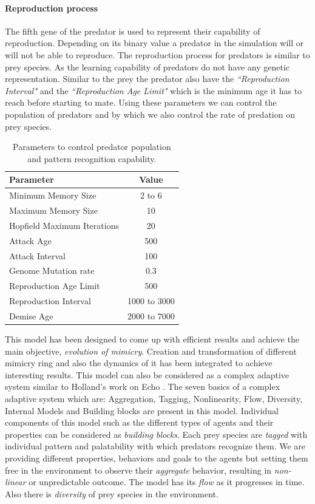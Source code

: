 \documentclass[letterpaper]{article}
\numberwithin{equation}{section}
\begin{document}
\paragraph{Reproduction process}
The  fifth gene of the predator is used to represent their capability of reproduction.  Depending on its binary value a predator in the simulation will or will not be able to reproduce. The reproduction process for predators is similar to prey species. As the learning capability of predators do not have any genetic representation. Similar to the prey the predator also have the \textsl{``Reproduction Interval"} and the \textsl{``Reproduction Age Limit"} which is the minimum age it has to reach before starting to mate. Using these parameters we can control the population of predators and by which we also control the rate of predation on prey species.

\begin{table}[h]
\small
\centering
\begin{tabular}{| l | c |}
	\hline
		\textbf{Parameter} & \textbf{Value} \\ \hline
		Minimum Memory Size & 2 to 6 \\ \hline
		Maximum Memory Size & 10 \\ \hline 
		Hopfield Maximum Iterations & 20 \\ \hline
		Attack Age & 500 \\ \hline
		Attack Interval & 100 \\ \hline
		Genome Mutation rate & 0.3 \\ \hline
		Reproduction Age Limit & 500 \\ \hline
		Reproduction Interval & 1000 to 3000 \\ \hline
		Demise Age & 2000 to 7000 \\
	\hline
\end{tabular}
\caption{Parameters to control predator population and pattern recognition capability.}
\label{tab:predator-control-parameters}
\end{table}

This model has been designed to come up with efficient results and achieve the main objective, \textit{evolution of mimicry}. Creation and transformation of different mimicry ring and also the dynamics of it has been integrated to achieve interesting results. This model can also be considered as a complex adaptive system similar to Holland's work on Echo \citep{holland1996}. The seven basics of a complex adaptive system which are: Aggregation, Tagging, Nonlinearity, Flow, Diversity, Internal Models and Building blocks \citep{holland1996} are present in this model. Individual components of this model such as the different types of agents and their properties can be considered as \textit{building blocks}. Each prey species are \textit{tagged} with individual pattern and palatability with which predators recognize them. We are providing different properties, behaviors and goals to the agents but setting them free in the environment to observe their \textit{aggregate} behavior, resulting in \textit{non-linear} or unpredictable outcome. The model has its \textit{flow} as it progresses in time. Also there is \textit{diversity} of prey species in the environment.
\end{document}
